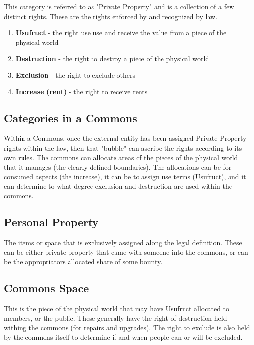\documentclass{article}
\begin{document}
This category is referred to as "Private Property" and is a collection of a few distinct rights. These are the rights enforced by and recognized by law. 

\begin{enumerate}
	
	\item \textbf{Usufruct} - the right use use and receive the value from a piece of the physical world

	\item \textbf{Destruction} - the right to destroy a piece of the physical world

	\item \textbf{Exclusion} -  the right to exclude others
 
	\item \textbf{Increase (rent)} - the right to receive rents
\end{enumerate}
	


\subsection{Categories in a Commons}

Within a Commons, once the external entity has been assigned Private Property rights within the law, then that "bubble" can ascribe the rights according to its own rules. The commons can allocate areas of the pieces of the physical world that it manages (the clearly defined boundaries). The allocations can be for consumed aspects (the increase), it can be to assign use terms (Usufruct), and it can determine to what degree exclusion and destruction are used within the commons.


\subsection{Personal Property} The items or space that is exclusively assigned along the legal definition. These can be either private property that came with someone into the commons, or can be the appropriators allocated share of some bounty. 


\subsection{Commons Space} This is the piece of the physical world that may have Usufruct allocated to members, or the public. These generally have the right of destruction held withing the commons (for repairs and upgrades). The right to exclude is also held by the commons itself to determine if and when people can or will be excluded. 
 
\end{document}

